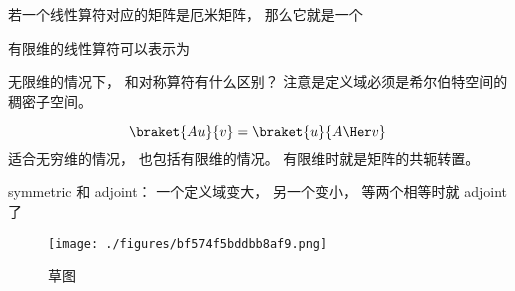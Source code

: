 
\begin{issues}
\issueDraft
\end{issues}



若一个线性算符对应的矩阵是厄米矩阵， 那么它就是一个

有限维的线性算符可以表示为

无限维的情况下， 和对称算符有什么区别？ 注意是定义域必须是希尔伯特空间的稠密子空间。


\begin{equation}
\braket{Au}{v} = \braket{u}{A\Her v}~
\end{equation}
适合无穷维的情况， 也包括有限维的情况。 有限维时就是矩阵的共轭转置。

symmetric 和 adjoint： 一个定义域变大， 另一个变小， 等两个相等时就 adjoint 了
\begin{figure}[ht]
\centering
\texttt{[image: ./figures/bf574f5bddbb8af9.png]}
\caption{草图} \label{fig_adjoin_1}
\end{figure}
